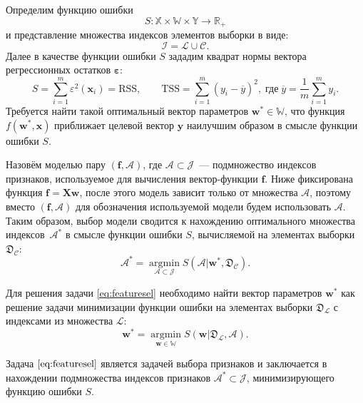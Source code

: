 \documentclass[a4paper,12pt]{article}
\newcommand{\bx}{\mathbf{x}}
\newcommand{\bw}{\mathbf{w}}
\newcommand{\by}{\mathbf{y}}
\newcommand{\bX}{\mathbf{X}}
\newcommand{\calJ}{\mathcal{J}}
\newcommand{\calA}{\mathcal{A}}
\newcommand{\frakD}{\mathfrak{D}}
\newcommand{\rss}{\mathrm{RSS}}
\newcommand{\tss}{\mathrm{TSS}}
\begin{document}
Определим функцию ошибки 
\begin{equation*}
S: \mathbb{X} \times \mathbb{W} \times \mathbb{Y} \rightarrow \mathbb{R}_+
\end{equation*}
и представление множества индексов элементов выборки в виде: 
\begin{equation*}
\mathcal{I} = \mathcal{L} \cup \mathcal{C}.
\label{eq:learntest}
\end{equation*}
Далее в качестве функции ошибки $S$ зададим квадрат нормы вектора регрессионных остатков $\boldsymbol{\varepsilon}$:
\begin{equation}
S = \sum\limits_{i = 1}^m \varepsilon^2(\bx_i) = \rss, \qquad \tss = \sum\limits_{i = 1}^m (y_i - \overline{y})^2, \; \text{где} \; \overline{y} = \frac{1}{m}\sum\limits_{i = 1}^m y_i.
\label{eq:error}
\end{equation} 
Требуется найти такой оптимальный вектор параметров $\bw^* \in \mathbb{W}$, что функция $f(\bw^*, \bx)$ приближает целевой вектор $\by$ наилучшим образом в смысле функции ошибки $S$. 

Назовём моделью пару $(\mathbf{f}, \calA)$, где $\calA \subset \calJ$~--- подмножество индексов признаков, используемое для вычисления вектор-функции $\mathbf{f}$. Ниже фиксирована функция $\mathbf{f} = \bX \bw$, после этого модель зависит только от множества $\calA$, поэтому вместо $(\mathbf{f}, \calA)$ для обозначения используемой модели будем использовать $\calA$. Таким образом, выбор модели сводится к нахождению оптимального множества индексов~$\calA^*$ в смысле функции ошибки $S$, вычисляемой на элементах выборки $\frakD_{\mathcal{C}}$:
\begin{equation}
\mathcal{A^*} = \mathop{\arg\min}\limits_{\mathcal{A} \subset \mathcal{J}} S(\mathcal{A} | \bw^*, \frakD_{\mathcal{C}}).
\label{eq:featuresel}
\end{equation}

Для решения задачи \eqref{eq:featuresel} необходимо найти вектор параметров $\bw^*$ как решение задачи минимизации функции ошибки на элементах выборки $\frakD_{\mathcal{L}}$ с индексами из множества $\mathcal{L}$:
\begin{equation}
\bw^* = \mathop{\arg\min}\limits_{\bw \in \mathbb{W}} S(\bw | \frakD_{\mathcal{L}}, \mathcal{A}).
\label{eq:optim_par}
\end{equation} 

Задача $\eqref{eq:featuresel}$ является задачей выбора признаков и заключается в нахождении подмножества индексов признаков $\calA^* \subset \calJ$, минимизирующего функцию ошибки $S$. 
\end{document}
